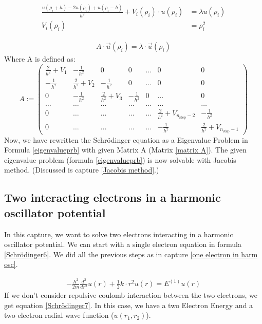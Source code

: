 \documentclass[10pt,a4paper]{article}
\begin{document}
\begin{align}
	\frac{u(\rho_i+h)-2u(\rho_i)+u(\rho_i-h)}{h^2}  + V_i(\rho_i) \cdot u(\rho_i) &= \lambda u(\rho_i) \label{Schrödinger5}\\
	V_i(\rho_i) &= \rho_i^2
\end{align}

\begin{align}
	A \cdot \vec{u}(\rho_i)  = \lambda \cdot \vec{u}(\rho_i) \label{eigenvalueprb}
\end{align}
Where A is defined as:
\begin{equation}
	A:=  \left( \begin{array}{ccccccc} \frac{2}{h^2}+V_1 & -\frac{1}{h^2} & 0   & 0    & \dots  &0     & 0 \\
		-\frac{1}{h^2} & \frac{2}{h^2}+V_2 & -\frac{1}{h^2} & 0    & \dots  &0     &0 \\
		0   & -\frac{1}{h^2} & \frac{2}{h^2}+V_3 & -\frac{1}{h^2}  &0       &\dots & 0\\
		\dots  & \dots & \dots & \dots  &\dots      &\dots & \dots\\
		0   & \dots & \dots & \dots  &\dots       &\frac{2}{h^2}+V_{n_{\mathrm{step}}-2} & -\frac{1}{h^2}\\
		0   & \dots & \dots & \dots  &\dots       &-\frac{1}{h^2} & \frac{2}{h^2}+V_{n_{\mathrm{step}}-1}
		
	\end{array} \right)  \label{matrix A}
\end{equation} 
Now, we have rewritten the Schrödinger equation as a Eigenvalue Problem in Formula \ref{eigenvalueprb} with given Matrix A (Matrix \ref{matrix A}). The given eigenvalue problem (formula \ref{eigenvalueprb}) is now solvable with Jacobis method. (Discussed is capture  \ref{Jacobis method}.)

\subsection{Two interacting electrons in a harmonic oscillator potential}

In this capture, we want to solve two electrons interacting in a harmonic oscillator potential.
We can start with a single electron equation in formula \ref{Schrödinger6}. We did all the previous steps as in capture  \ref{one electron in harm osc}. 

\begin{align}
	-\frac{\hbar^2}{2 m}  \frac{d^2}{dr^2} u(r)+ \frac{1}{2}k \cdot r^2 u(r)= E^{(1)} u(r) \label{Schrödinger6}
\end{align}
If we don't consider repulsive coulomb interaction between the two electrons, we get equation \ref{Schrödinger7}. In this case, we have a two Electron Energy and a two electron radial wave function ($u(r_1,r_2)$). 
\end{document}
